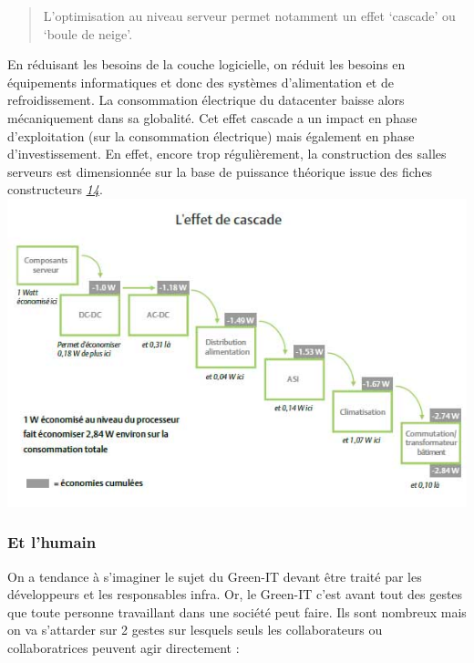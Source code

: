 \begin{quote}
L'optimisation au niveau serveur permet notamment un effet `cascade' ou
`boule de neige'.
\end{quote}

En réduisant les besoins de la couche logicielle, on réduit les besoins
en équipements informatiques et donc des systèmes d'alimentation et de
refroidissement. La consommation électrique du datacenter baisse alors
mécaniquement dans sa globalité. Cet effet cascade a un impact en phase
d'exploitation (sur la consommation électrique) mais également en phase
d'investissement. En effet, encore trop régulièrement, la construction
des salles serveurs est dimensionnée sur la base de puissance théorique
issue des fiches constructeurs
\emph{\href{https://www.ademe.fr/sites/default/files/assets/documents/guide-lecture-livre-blanc-consommation-energetique-2015.pdf}{14}}.\\
\includegraphics{img/effet-cascade.jpg}

\hypertarget{et-lhumain}{%
\subsubsection{Et l'humain}\label{et-lhumain}}

On a tendance à s'imaginer le sujet du Green-IT devant être traité par
les développeurs et les responsables infra. Or, le Green-IT c'est avant
tout des gestes que toute personne travaillant dans une société peut
faire. Ils sont nombreux mais on va s'attarder sur 2 gestes sur lesquels
seuls les collaborateurs ou collaboratrices peuvent agir directement :

